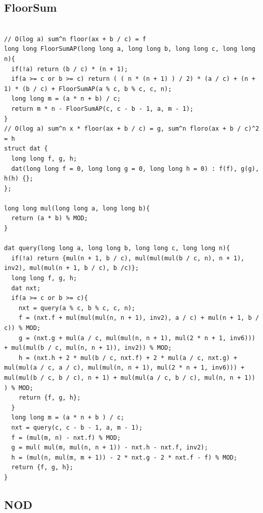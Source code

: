 \documentclass[9pt, landscape, a4paper,twosided]{extarticle}
\begin{document}
\begin{multicols*}{3}
\subsection{FloorSum}
\begin{verbatim}

// O(log a) sum^n floor(ax + b / c) = f
long long FloorSumAP(long long a, long long b, long long c, long long n){
  if(!a) return (b / c) * (n + 1);
  if(a >= c or b >= c) return ( ( n * (n + 1) ) / 2) * (a / c) + (n + 1) * (b / c) + FloorSumAP(a % c, b % c, c, n);
  long long m = (a * n + b) / c;
  return m * n - FloorSumAP(c, c - b - 1, a, m - 1);
}
// O(log a) sum^n x * floor(ax + b / c) = g, sum^n floro(ax + b / c)^2 = h
struct dat {
  long long f, g, h;
  dat(long long f = 0, long long g = 0, long long h = 0) : f(f), g(g), h(h) {};
};

long long mul(long long a, long long b){
  return (a * b) % MOD;
}

dat query(long long a, long long b, long long c, long long n){
  if(!a) return {mul(n + 1, b / c), mul(mul(mul(b / c, n), n + 1), inv2), mul(mul(n + 1, b / c), b /c)};
  long long f, g, h;
  dat nxt;
  if(a >= c or b >= c){
    nxt = query(a % c, b % c, c, n);
    f = (nxt.f + mul(mul(mul(n, n + 1), inv2), a / c) + mul(n + 1, b / c)) % MOD;
    g = (nxt.g + mul(a / c, mul(mul(n, n + 1), mul(2 * n + 1, inv6))) + mul(mul(b / c, mul(n, n + 1)), inv2)) % MOD;
    h = (nxt.h + 2 * mul(b / c, nxt.f) + 2 * mul(a / c, nxt.g) + mul(mul(a / c, a / c), mul(mul(n, n + 1), mul(2 * n + 1, inv6))) + mul(mul(b / c, b / c), n + 1) + mul(mul(a / c, b / c), mul(n, n + 1)) ) % MOD;
    return {f, g, h};
  }
  long long m = (a * n + b ) / c;
  nxt = query(c, c - b - 1, a, m - 1);
  f = (mul(m, n) - nxt.f) % MOD;
  g = mul( mul(m, mul(n, n + 1)) - nxt.h - nxt.f, inv2);
  h = (mul(n, mul(m, m + 1)) - 2 * nxt.g - 2 * nxt.f - f) % MOD;
  return {f, g, h};
}
\end{verbatim}

\subsection{NOD}
\begin{verbatim}


\end{verbatim}
\end{multicols*}
\end{document}
